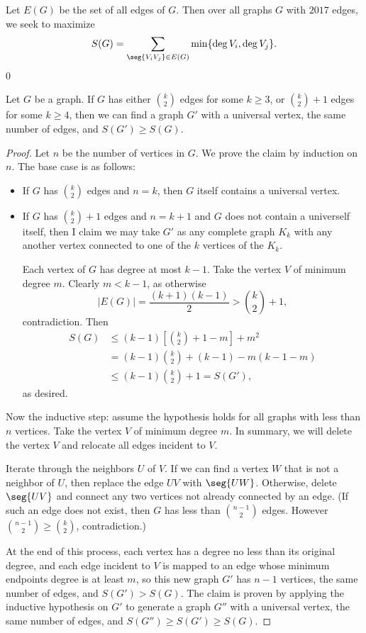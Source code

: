 Let $E(G)$ be the set of all edges of $G$. Then over all graphs $G$ with $2017$ edges, we seek to maximize \[S(G)=\sum_{\seg{V_iV_j}\in E(G)}\min\{\deg V_i,\deg V_j\}.\]
\setcounter{claim}0
\begin{claim}
    Let $G$ be a graph. If $G$ has either $\binom k2$ edges for some $k\ge3$, or $\binom k2+1$ edges for some $k\ge4$, then we can find a graph $G'$ with a universal vertex, the same number of edges, and $S(G')\ge S(G)$.
\end{claim}
\begin{proof}
    Let $n$ be the number of vertices in $G$. We prove the claim by induction on $n$. The base case is as follows:
    \begin{itemize}
        \item If $G$ has $\binom k2$ edges and $n=k$, then $G$ itself contains a universal vertex.
        \item If $G$ has $\binom k2+1$ edges and $n=k+1$ and $G$ does not contain a univerself itself, then I claim we may take $G'$ as any complete graph $K_k$ with any another vertex connected to one of the $k$ vertices of the $K_k$.

            Each vertex of $G$ has degree at most $k-1$. Take the vertex $V$ of minimum degree $m$. Clearly $m<k-1$, as otherwise \[|E(G)|=\frac{(k+1)(k-1)}2>\binom k2+1,\]
            contradiction. Then
            \begin{align*}
                S(G)&\le(k-1)\left[\binom k2+1-m\right]+m^2\\
                &=(k-1)\binom k2+(k-1)-m(k-1-m)\\
                &\le(k-1)\binom k2+1=S(G'),
            \end{align*}
            as desired.
    \end{itemize}
    Now the inductive step: assume the hypothesis holds for all graphs with less than $n$ vertices. Take the vertex $V$ of minimum degree $m$. In summary, we will delete the vertex $V$ and relocate all edges incident to $V$.

    Iterate through the neighbors $U$ of $V$. If we can find a vertex $W$ that is not a neighbor of $U$, then replace the edge $UV$ with $\seg{UW}$. Otherwise, delete $\seg{UV}$ and connect any two vertices not already connected by an edge. (If such an edge does not exist, then $G$ has less than $\binom{n-1}2$ edges. However $\binom{n-1}2\ge\binom k2$, contradiction.)

    At the end of this process, each vertex has a degree no less than its original degree, and each edge incident to $V$ is mapped to an edge whose minimum endpoints degree is at least $m$, so this new graph $G'$ has $n-1$ vertices, the same number of edges, and $S(G')>S(G)$. The claim is proven by applying the inductive hypothesis on $G'$ to generate a graph $G''$ with a universal vertex, the same number of edges, and $S(G'')\ge S(G')\ge S(G)$.
\end{proof}


